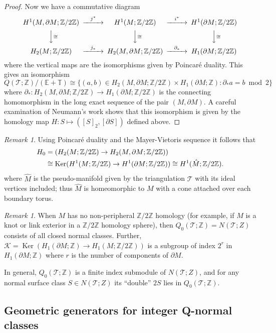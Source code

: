 \documentclass[12pt,reqno]{amsart}  %
\theoremstyle{definition}
\theoremstyle{remark}
\newtheorem{rmk}[thm]{Remark}
\newcommand{\TT}{\mathbb{T}}
\newcommand{\T}{\mathcal{T}}
\def\Z{\mathbb Z}
\def\bd{\partial}
\DeclareMathOperator{\Ker}{Ker}
\let\Im\relax
\DeclareMathOperator{\Im}{Im}
\def\TT{\mathbb T}   %
\def\EE{\mathbb E}   %
\begin{document}
\begin{proof}
Now we have a commutative diagram
$$
\begin{CD}
H^1(M,\bd M;\Z/2\Z) @>j^*>> H^1(M;\Z/2\Z) @>i^*>> H^1(\bd M;\Z/2\Z) \\
@VV\cong V                      @VV\cong V     @VV\cong V          \\
H_2(M;\Z/2\Z) @>j_*>> H_2(M,\bd M; \Z/2\Z)  @>\bd_*>>   H_1(\bd M; \Z/2\Z)
\end{CD}
$$
where the vertical maps are the isomorphisms given by Poincar\'e duality.
This gives an isomorphism 
$$
Q(\T;\Z)/(\EE + \TT) \cong \{ (a,b) \in  H_2(M,\bd M;\Z/2\Z) 
\times H_1(\bd M;\Z) : \bd_* a =   b\bmod 2  \}
$$
where 
$\bd_*: H_2(M,\bd M;\Z/2\Z) \to H_1(\bd M;\Z/2\Z) $ is the connecting 
homomorphism in the long exact sequence of the pair $(M, \bd M)$. 
A careful examination of Neumann's work shows that this isomorphism
is given by the homology map $H :S \mapsto ([S]_2,[\bd S])$ defined above.  
\end{proof}

\begin{rmk} 
Using Poincar\'e duality and the Mayer-Vietoris sequence it follows that
\begin{align*}
\Im H_0 &= \Im ( H_2(M;\Z/2\Z) \to H_2(M,\bd M;\Z/2\Z)) \\ 
&\cong \Ker (H^1(M;\Z/2\Z) \to H^1(\bd M; \Z/2\Z)) \cong H^1(\hat M; \Z/2\Z).
\end{align*}
where $\hat M$ is the pseudo-manifold given by the triangulation $\T$ 
with its ideal vertices included; thus $\hat M$ is homeomorphic to $M$ with 
a cone attached over each boundary torus.
\end{rmk}

\begin{rmk}
When $M$ has no non-peripheral $\Z/2\Z$ homology (for example, if $M$ is 
a knot or link exterior in a $\Z/2\Z$ homology sphere), then 
$Q_0(\T;\Z) = N(\T;Z)$  consists of all closed normal classes.
Further, ${\mathcal K} =\Ker(H_1(\bd M;\Z) \to H_1(M;\Z/2\Z))$ is a 
subgroup of index $2^r$ in $H_1(\bd M;\Z)$ where $r$ is the number of 
components of $\bd M$.

In general, $Q_0(\T;\Z)$ is a finite index submodule of $N(\T;Z)$, and for 
any normal surface class $S \in N(\T;Z)$
its ``double'' $2S$ lies in $Q_0(\T;\Z)$.
\end{rmk}

\subsection{Geometric generators for integer Q-normal classes}
\label{subsect:gen_q_normal}
\end{document}
